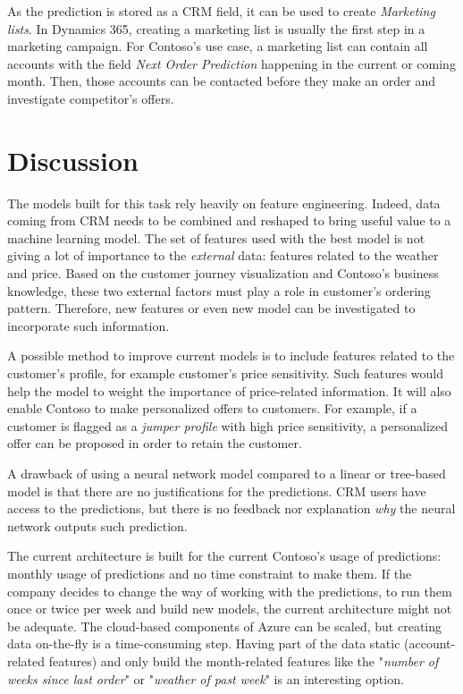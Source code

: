 As the prediction is stored as a CRM field, it can be used to create \textit{Marketing lists}. In Dynamics 365, creating a marketing list is usually the first step in a marketing campaign. For Contoso's use case, a marketing list can contain all accounts with the field \textit{Next Order Prediction} happening in the current or coming month. Then, those accounts can be contacted before they make an order and investigate competitor's offers.


\section{Discussion} \label{sec:use-case-further-work}
The models built for this task rely heavily on feature engineering. Indeed, data coming from CRM needs to be combined and reshaped to bring useful value to a machine learning model. The set of features used with the best model is not giving a lot of importance to the \textit{external} data: features related to the weather and price. Based on the customer journey visualization and Contoso's business knowledge, these two external factors must play a role in customer's ordering pattern. Therefore, new features or even new model can be investigated to incorporate such information.

A possible method to improve current models is to include features related to the customer's profile, for example customer's price sensitivity. Such features would help the model to weight the importance of price-related information. It will also enable Contoso to make personalized offers to customers. For example, if a customer is flagged as a \textit{jumper profile} with high price sensitivity, a personalized offer can be proposed in order to retain the customer.

A drawback of using a neural network model compared to a linear or tree-based model is that there are no justifications for the predictions. CRM users have access to the predictions, but there is no feedback nor explanation \textit{why} the neural network outputs such prediction.

The current architecture is built for the current Contoso's usage of predictions: monthly usage of predictions and no time constraint to make them. If the company decides to change the way of working with the predictions, to run them once or twice per week and build new models, the current architecture might not be adequate. The cloud-based components of Azure can be scaled, but creating data on-the-fly is a time-consuming step. Having part of the data static (account-related features) and only build the month-related features like the "\textit{number of weeks since last order}" or "\textit{weather of past week}" is an interesting option.

